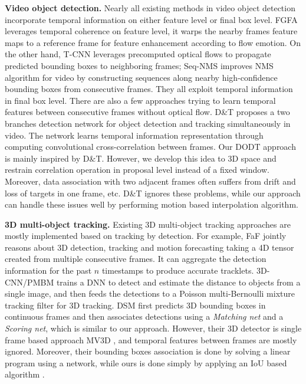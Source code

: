 \documentclass[letterpaper, 10pt, conference]{ieeeconf}  %
\begin{document}
\textbf{Video object detection.} Nearly all existing methods in video object detection incorporate temporal information on either feature level or final box level. FGFA \cite{zhu2017flow} leverages temporal coherence on feature level, it warps the nearby frames feature maps to a reference frame for feature enhancement according to flow emotion. On the other hand, T-CNN \cite{kang2018t, kang2016object} leverages precomputed optical flows to propagate predicted bounding boxes to neighboring frames; Seq-NMS \cite{han2016seq} improves NMS algorithm for video by constructing sequences along nearby high-confidence bounding boxes from consecutive frames. They all exploit temporal information in final box level. There are also a few approaches trying to learn temporal features between consecutive frames without optical flow. D\&T \cite{feichtenhofer2017detect} proposes a two branches detection network for object detection and tracking simultaneously in video. The network learns temporal information representation through computing convolutional cross-correlation between frames. Our DODT approach is mainly inspired by D\&T. However, we develop this idea to 3D space and restrain correlation operation in proposal level instead of a fixed window. Moreover, data association with two adjacent frames often suffers from drift and loss of targets in one frame, etc. D\&T ignores these problems, while our approach can handle these issues well by performing motion based interpolation algorithm.

\textbf{3D multi-object tracking.} Existing 3D multi-object tracking approaches are mostly implemented based on tracking by detection. For example, FaF \cite{luo2018fast} jointly reasons about 3D detection, tracking and motion forecasting taking a 4D tensor created from multiple consecutive frames. It can aggregate the detection information for the past $n$ timestamps to produce accurate tracklets. 3D-CNN/PMBM \cite{scheidegger2018mono} trains a DNN to detect and estimate the distance to objects from a single image, and then feeds the detections to a Poisson multi-Bernoulli mixture tracking filter for 3D tracking. DSM \cite{frossard2018end} first predicts 3D bounding boxes in continuous frames and then associates detections using a \textit{Matching net} and a \textit{Scoring net}, which is similar to our approach. However, their 3D detector is single frame based approach MV3D \cite{chen2017multi}, and temporal features between frames are mostly ignored. Moreover, their bounding boxes association is done by solving a linear program using a network, while ours is done simply by applying an IoU based algorithm \cite{bochinski2018extending}.
\end{document}
